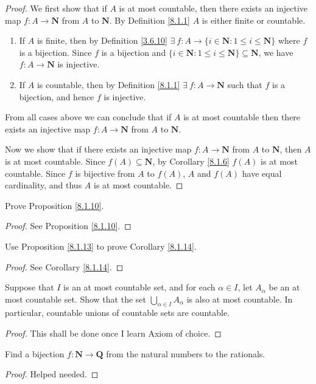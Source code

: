 \begin{proof}
    We first show that if \(A\) is at most countable, then there exists an injective map \(f : A \to \mathbf{N}\) from \(A\) to \(\mathbf{N}\).
    By Definition \ref{8.1.1} \(A\) is either finite or countable.
    \begin{enumerate}
        \item If \(A\) is finite, then by Definition \ref{3.6.10} \(\exists\ f : A \to \{i \in \mathbf{N} : 1 \leq i \leq \mathbf{N}\}\) where \(f\) is a bijection.
              Since \(f\) is a bijection and \(\{i \in \mathbf{N} : 1 \leq i \leq \mathbf{N}\} \subseteq \mathbf{N}\), we have \(f : A \to \mathbf{N}\) is injective.
        \item If \(A\) is countable, then by Definition \ref{8.1.1} \(\exists\ f : A \to \mathbf{N}\) such that \(f\) is a bijection, and hence \(f\) is injective.
    \end{enumerate}
    From all cases above we can conclude that if \(A\) is at most countable then there exists an injective map \(f : A \to \mathbf{N}\) from \(A\) to \(\mathbf{N}\).

    Now we show that if there exists an injective map \(f : A \to \mathbf{N}\) from \(A\) to \(\mathbf{N}\), then \(A\) is at most countable.
    Since \(f(A) \subseteq \mathbf{N}\), by Corollary \ref{8.1.6} \(f(A)\) is at most countable.
    Since \(f\) is bijective from \(A\) to \(f(A)\), \(A\) and \(f(A)\) have equal cardinality, and thus \(A\) is at most countable.
\end{proof}

\begin{exercise}\label{ex 8.1.7}
    Prove Proposition \ref{8.1.10}.
\end{exercise}

\begin{proof}
    See Proposition \ref{8.1.10}.
\end{proof}

\begin{exercise}\label{ex 8.1.8}
    Use Proposition \ref{8.1.13} to prove Corollary \ref{8.1.14}.
\end{exercise}

\begin{proof}
    See Corollary \ref{8.1.14}.
\end{proof}

\begin{exercise}\label{ex 8.1.9}
    Suppose that \(I\) is an at most countable set, and for each \(\alpha \in I\), let \(A_{\alpha}\) be an at most countable set.
    Show that the set \(\bigcup_{\alpha \in I} A_{\alpha}\) is also at most countable.
    In particular, countable unions of countable sets are countable.
\end{exercise}

\begin{proof}
    This shall be done once I learn Axiom of choice.
\end{proof}

\begin{exercise}\label{ex 8.1.10}
    Find a bijection \(f : \mathbf{N} \to \mathbf{Q}\) from the natural numbers to the rationals.
\end{exercise}

\begin{proof}
    Helped needed.
\end{proof}